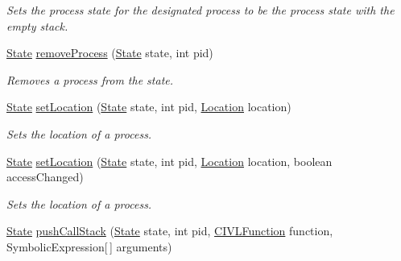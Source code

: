 \begin{DoxyCompactItemize}
\begin{DoxyCompactList}\small\item\em Sets the process state for the designated process to be the process state with the empty stack. \end{DoxyCompactList}\item 
\hyperlink{interfaceedu_1_1udel_1_1cis_1_1vsl_1_1civl_1_1state_1_1IF_1_1State}{State} \hyperlink{interfaceedu_1_1udel_1_1cis_1_1vsl_1_1civl_1_1state_1_1IF_1_1StateFactory_a5f969c52d703e39c812dfde91ad68d75}{remove\+Process} (\hyperlink{interfaceedu_1_1udel_1_1cis_1_1vsl_1_1civl_1_1state_1_1IF_1_1State}{State} state, int pid)
\begin{DoxyCompactList}\small\item\em Removes a process from the state. \end{DoxyCompactList}\item 
\hyperlink{interfaceedu_1_1udel_1_1cis_1_1vsl_1_1civl_1_1state_1_1IF_1_1State}{State} \hyperlink{interfaceedu_1_1udel_1_1cis_1_1vsl_1_1civl_1_1state_1_1IF_1_1StateFactory_ad68188e38333826e7f585b5ceb858a08}{set\+Location} (\hyperlink{interfaceedu_1_1udel_1_1cis_1_1vsl_1_1civl_1_1state_1_1IF_1_1State}{State} state, int pid, \hyperlink{interfaceedu_1_1udel_1_1cis_1_1vsl_1_1civl_1_1model_1_1IF_1_1location_1_1Location}{Location} location)
\begin{DoxyCompactList}\small\item\em Sets the location of a process. \end{DoxyCompactList}\item 
\hyperlink{interfaceedu_1_1udel_1_1cis_1_1vsl_1_1civl_1_1state_1_1IF_1_1State}{State} \hyperlink{interfaceedu_1_1udel_1_1cis_1_1vsl_1_1civl_1_1state_1_1IF_1_1StateFactory_a3d545b10a549db49479268ea772245b1}{set\+Location} (\hyperlink{interfaceedu_1_1udel_1_1cis_1_1vsl_1_1civl_1_1state_1_1IF_1_1State}{State} state, int pid, \hyperlink{interfaceedu_1_1udel_1_1cis_1_1vsl_1_1civl_1_1model_1_1IF_1_1location_1_1Location}{Location} location, boolean access\+Changed)
\begin{DoxyCompactList}\small\item\em Sets the location of a process. \end{DoxyCompactList}\item 
\hyperlink{interfaceedu_1_1udel_1_1cis_1_1vsl_1_1civl_1_1state_1_1IF_1_1State}{State} \hyperlink{interfaceedu_1_1udel_1_1cis_1_1vsl_1_1civl_1_1state_1_1IF_1_1StateFactory_a3c7ba7469eca87e1359b63656f6de1fb}{push\+Call\+Stack} (\hyperlink{interfaceedu_1_1udel_1_1cis_1_1vsl_1_1civl_1_1state_1_1IF_1_1State}{State} state, int pid, \hyperlink{interfaceedu_1_1udel_1_1cis_1_1vsl_1_1civl_1_1model_1_1IF_1_1CIVLFunction}{C\+I\+V\+L\+Function} function, Symbolic\+Expression\mbox{[}$\,$\mbox{]} arguments)

\end{DoxyCompactItemize}
